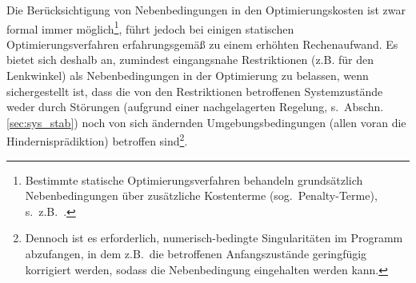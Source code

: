 Die Berücksichtigung von Nebenbedingungen in den Optimierungskosten ist zwar formal immer möglich\footnote{Bestimmte statische Optimierungsverfahren behandeln grundsätzlich Nebenbedingungen über zusätzliche Kostenterme (sog.\ Penalty-Terme), s.\ z.B.\ \cite{papageorgiou2012optimierung, nocedal2006numerical}.}, führt jedoch bei einigen statischen Optimierungsverfahren erfahrungsgemäß zu einem erhöhten Rechenaufwand. Es bietet sich deshalb an, zumindest eingangsnahe Restriktionen (z.B. für den Lenkwinkel) als Nebenbedingungen in der Optimierung zu belassen, wenn sichergestellt ist, dass die von den Restriktionen betroffenen Systemzustände weder durch Störungen (aufgrund einer nachgelagerten Regelung, s.\ Abschn.\,\ref{sec:sys_stab}) noch von sich ändernden Umgebungsbedingungen (allen voran die Hindernisprädiktion) betroffen sind\footnote{Dennoch ist es erforderlich, numerisch-bedingte Singularitäten im Programm abzufangen, in dem z.B.\ die betroffenen Anfangszustände geringfügig korrigiert werden, sodass die Nebenbedingung eingehalten werden kann.}.   \\











